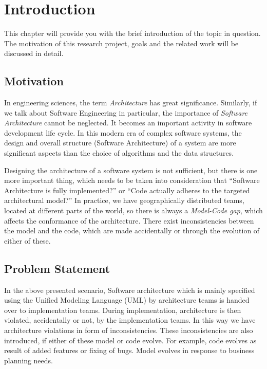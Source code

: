 \chapter{Introduction}\label{intro}
This chapter will provide you with the brief introduction of the topic in question. The motivation of this research project, goals and the related work will be discussed in detail.

\section{Motivation}\label{motivation}
In engineering sciences, the term \textit{Architecture} has great significance. Similarly, if we talk about Software Engineering in particular, the importance of \textit{Software Architecture} cannot be neglected. It becomes an important activity in software development life cycle. In this modern era of complex software systems, the design and overall structure (Software Architecture) of a system are more significant aspects than the choice of algorithms and the data structures.\newline

Designing the architecture of a software system is not sufficient, but there is one more important thing, which needs to be taken into consideration that “Software Architecture is fully implemented?” or “Code actually adheres to the targeted architectural model?” In practice, we have geographically distributed teams, located at different parts of the world, so there is always a \textit{Model-Code gap}, which affects the conformance of the architecture. There exist inconsistencies  between the model and the code, which are made accidentally or through the evolution of either of these.\newline

\section{Problem Statement}\label{problemStatement}
In the above presented scenario, Software architecture which is mainly specified using the Unified Modeling Language (UML) by architecture teams is handed over to implementation teams. During implementation, architecture is then violated, accidentally or not, by the implementation teams. In this way we have architecture violations in form of inconsistencies. These inconsistencies are also introduced, if either of these model or code evolve. For example, code evolves as result of added features or fixing of bugs. Model evolves in response to business planning needs. \newline

